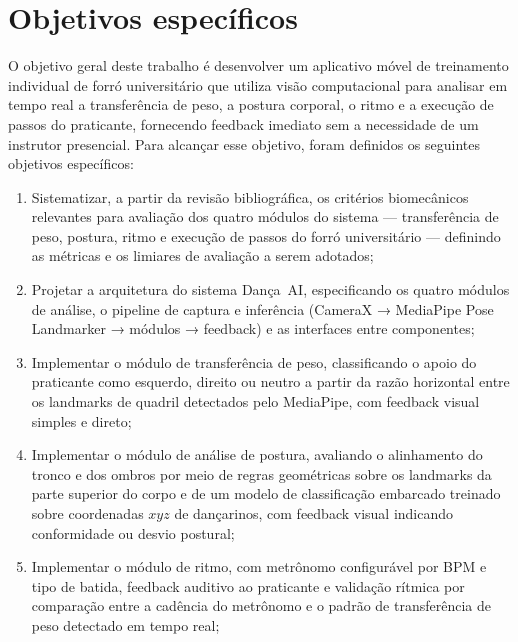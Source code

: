 \newpage
\section{Objetivos específicos}
\label{sec:objetivos}

O objetivo geral deste trabalho é desenvolver um aplicativo móvel de
treinamento individual de forró universitário que utiliza visão computacional
para analisar em tempo real a transferência de peso, a postura corporal, o
ritmo e a execução de passos do praticante, fornecendo feedback imediato sem
a necessidade de um instrutor presencial. Para alcançar esse objetivo, foram
definidos os seguintes objetivos específicos:

\begin{enumerate}
    \item Sistematizar, a partir da revisão bibliográfica, os critérios
    biomecânicos relevantes para avaliação dos quatro módulos do sistema ---
    transferência de peso, postura, ritmo e execução de passos do forró
    universitário --- definindo as métricas e os limiares de avaliação a
    serem adotados;

    \item Projetar a arquitetura do sistema Dança~AI, especificando os quatro
    módulos de análise, o pipeline de captura e inferência (CameraX →
    MediaPipe Pose Landmarker → módulos → feedback) e as interfaces entre
    componentes;

    \item Implementar o módulo de transferência de peso, classificando o
    apoio do praticante como esquerdo, direito ou neutro a partir da razão
    horizontal entre os landmarks de quadril detectados pelo MediaPipe, com
    feedback visual simples e direto;

    \item Implementar o módulo de análise de postura, avaliando o
    alinhamento do tronco e dos ombros por meio de regras geométricas sobre
    os landmarks da parte superior do corpo e de um modelo de classificação
    embarcado treinado sobre coordenadas $xyz$ de dançarinos, com feedback visual indicando
    conformidade ou desvio postural;

    \item Implementar o módulo de ritmo, com metrônomo configurável por BPM e
    tipo de batida, feedback auditivo ao praticante e validação rítmica por
    comparação entre a cadência do metrônomo e o padrão de transferência de
    peso detectado em tempo real;


\end{enumerate}
